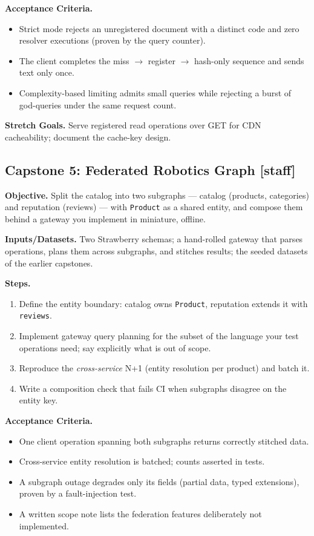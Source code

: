 \textbf{Acceptance Criteria.}
\begin{itemize}
  \item[$\square$] Strict mode rejects an unregistered document with a
        distinct code and zero resolver executions (proven by the query
        counter).
  \item[$\square$] The client completes the miss $\to$ register $\to$
        hash-only sequence and sends text only once.
  \item[$\square$] Complexity-based limiting admits small queries while
        rejecting a burst of god-queries under the same request count.
\end{itemize}

\textbf{Stretch Goals.} Serve registered read operations over GET for CDN
cacheability; document the cache-key design.

\subsection{Capstone 5: Federated Robotics Graph [staff]}

\textbf{Objective.} Split the catalog into two subgraphs --- catalog
(products, categories) and reputation (reviews) --- with
\texttt{Product} as a shared entity, and compose them behind a gateway
you implement in miniature, offline.

\textbf{Inputs/Datasets.} Two Strawberry schemas; a hand-rolled gateway
that parses operations, plans them across subgraphs, and stitches
results; the seeded datasets of the earlier capstones.

\textbf{Steps.}
\begin{enumerate}
  \item Define the entity boundary: catalog owns \texttt{Product},
        reputation extends it with \texttt{reviews}.
  \item Implement gateway query planning for the subset of the language
        your test operations need; say explicitly what is out of scope.
  \item Reproduce the \emph{cross-service} N+1 (entity resolution per
        product) and batch it.
  \item Write a composition check that fails CI when subgraphs disagree
        on the entity key.
\end{enumerate}

\textbf{Acceptance Criteria.}
\begin{itemize}
  \item[$\square$] One client operation spanning both subgraphs returns
        correctly stitched data.
  \item[$\square$] Cross-service entity resolution is batched; counts
        asserted in tests.
  \item[$\square$] A subgraph outage degrades only its fields (partial
        data, typed extensions), proven by a fault-injection test.
  \item[$\square$] A written scope note lists the federation features
        deliberately not implemented.
\end{itemize}

